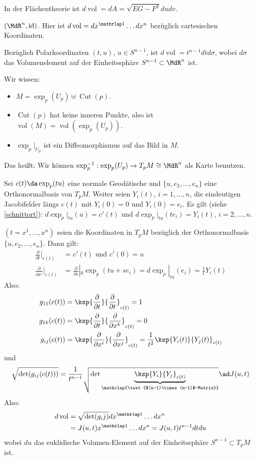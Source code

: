 \documentclass[a4paper,twoside,DIV15,BCOR12mm]{scrbook}
\DeclareMathOperator{\cut}{Cut}
\DeclareMathOperator{\vol}{vol}
\begin{document}
\begin{beispiele}
\item In der Flächentheorie ist $d\vol = dA = \sqrt{EG-F^2}du dv$.
\item $(\MdR^n,\text{id})$. Hier ist $d\vol = dx^{\mathrlap 1}\ldots dx^n$ bezüglich cartesischen Koordinaten.

Bezüglich Polarkoordinaten $(t,u)$, $u\in S^{n-1}$, ist $d\vol = t^{n-1}dtd\sigma$, wobei $d\sigma$ das Volumenelement auf der Einheitssphäre $S^{n-1}\subset \MdR^n$ ist.
\end{beispiele}

Wir wissen:
\begin{itemize}
\item $M=\exp_p(U_p) \uplus \cut(p)$.
\item $\cut(p)$ hat keine inneren Punkte, also ist $\vol(M) = \vol(\exp_p(U_p))$.
\item $\exp_p|_{U_p}$ ist ein Diffeomorphismus auf das Bild in $M$. 
\end{itemize}
Das heißt: Wir können $\exp_p^{-1}: \exp_p(U_p) \to T_pM\cong \MdR^n$ als Karte benutzen.

Sei $c(t)\da \exp_p(tu)$ eine normale Geodätische und $\{u,e_2,\ldots,e_n\}$ eine Orthonormalbasis von $T_pM$. Weiter seien $Y _i(t)$, $i=1,\ldots,n$, die eindeutigen Jacobifelder längs $c(t)$ mit $Y _i(0)=0$ und $Y _i(0)=e_i$. Es gilt (siehe \ref{schnittort}): $d\exp_p|_{tu}(u)= c'(t)$ und $d\exp_p|_{tu}(te_i)=Y _i(t)$, $i=2,\ldots,n$.

$(t=x^1,\ldots,x^n)$ seien die Koordinaten in $T_pM$ bezüglich der Orthonormalbasis $\{u,e_2,\ldots,e_n\}$. Dann gilt:
\begin{align*}
\frac{\partial}{\partial t}|_{c(t)} &= c'(t) \text{ und } c'(0)=u \\
\frac{\partial}{\partial x^i}|_{c(t)} &= \frac{\partial}{\partial s}|_0 \exp_p(tu+se_i) = d\exp_p|_{tu}(e_i) = \frac 1 t Y _i(t)
\end{align*}
Also:
\begin{align*}
g_{11}(c(t)) &= \ksp{\frac\partial{\partial t}}{\frac\partial{\partial t}}_{c(t)} = 1 \\
g_{1k}(c(t)) &= \ksp{\frac\partial{\partial t}}{\frac\partial{\partial x^k}}_{c(t)} = 0 \\
g_{ij}(c(t)) &= \ksp{\frac\partial{\partial x^i}}{\frac\partial{\partial x^j}}_{c(t)} = \frac 1 {t^2} \ksp{Y _i(t)}{Y _j(t)}_{c(t)} \\
\end{align*}
und
\[
\sqrt{\det (g_{ij}(c(t)))} = \frac 1 {t^{n-1}} \sqrt{\det \underbrace{\ksp{Y _i}{Y _j}_{c(t)}}_{\mathclap{\text{$(n-1)\times(n-1)$-Matrix}}}} \ad J(u,t)
\]
Also:
\begin{align*}
d\vol &= \sqrt{\det(g_ij)}dx^{\mathrlap 1}\ldots dx^n \\
 &= J(u,t)x^{\mathrlap 1}\ldots dx^n = J(u,t)t^{n-1}dt du
\end{align*}
wobei $du$ das euklidische Volumen-Element auf der Einheitssphäre $S^{n-1}\subset T_pM$ ist.
\end{document}
